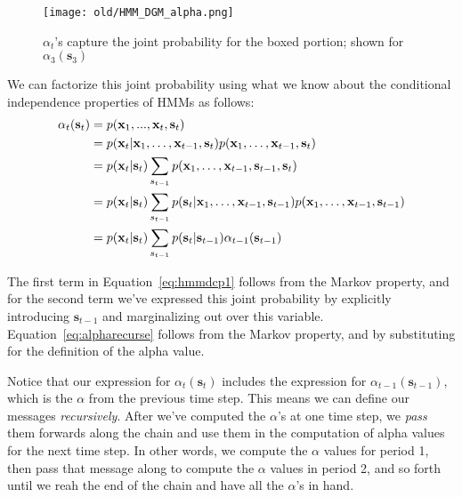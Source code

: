 \begin{figure}[h!]
    \centering
    \texttt{[image: old/HMM\_DGM\_alpha.png]}
    \caption{$\alpha_t$'s capture the joint probability for the boxed portion; shown for $\alpha_3(\mathbf{s}_3)$}
    \label{fig:HMM-DGM-alpha}
\end{figure}




We can factorize this joint probability using what we know about the conditional independence properties of HMMs as follows:
%
\begin{align} 
  \alpha_t(\textbf{s}_t) &= p(\textbf{x}_1, ..., \textbf{x}_t, \textbf{s}_t) \notag \\
                         &=p(\textbf{x}_t|\textbf{x}_1,\ldots,\textbf{x}_{t-1},\textbf{s}_t)p(\textbf{x}_1,\ldots,\textbf{x}_{t-1},\textbf{s}_t)\notag \\
                         &=p(\textbf{x}_t|\textbf{s}_t)\sum_{s_{t-1}}p(\textbf{x}_1,\ldots,\textbf{x}_{t-1},\textbf{s}_{t-1},\textbf{s}_t) \label{eq:hmmdcp1} \\
                         &=p(\textbf{x}_t|\textbf{s}_t)\sum_{s_{t-1}}p(\textbf{s}_t|\textbf{x}_1,\ldots,\textbf{x}_{t-1},\textbf{s}_{t-1})p(\textbf{x}_1,\ldots,\textbf{x}_{t-1},\textbf{s}_{t-1})\\
  &= p(\textbf{x}_t | \textbf{s}_t) \sum_{s_{t-1}} p(\textbf{s}_t | \textbf{s}_{t-1}) \alpha_{t-1}(\textbf{s}_{t-1})\label{eq:alpharecurse}
\end{align}

The first term in Equation~\eqref{eq:hmmdcp1} follows from the Markov property, and for the second term we've expressed this joint probability by explicitly introducing $\textbf{s}_{t-1}$ and marginalizing out over this variable. Equation~\ref{eq:alpharecurse} follows from the Markov property, and by
substituting for the definition of the alpha value. 



Notice that our expression for $\alpha_t(\textbf{s}_t)$ includes the expression for $\alpha_{t-1}(\textbf{s}_{t-1})$, which is the $\alpha$ from the previous time step.
This means we can define our messages \textit{recursively}.
%
After we've computed the $\alpha$'s at one time step,
we \textit{pass} them forwards along the chain and use them in the computation of
alpha values for the next time step.
%
In other words, we compute the $\alpha$ values for period 1, then pass that message along to compute the $\alpha$ values  in period 2, and so forth until we reah the end of the chain and have all the $\alpha$'s in hand.

